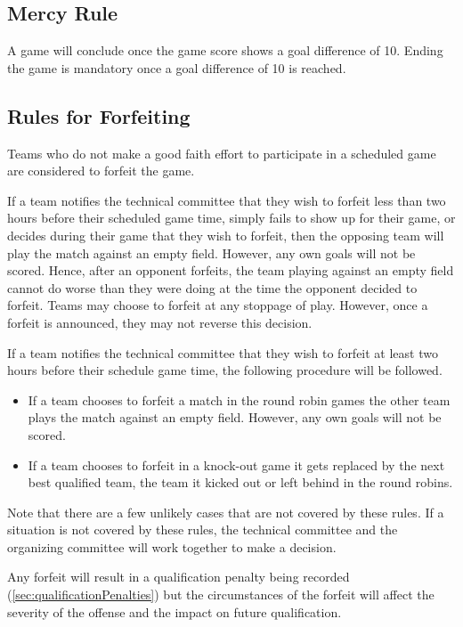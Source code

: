 \subsection{Mercy Rule}
\label{sec:mercy_rule}
A game will conclude once the game score shows a goal difference of 10.  Ending the game is mandatory once a goal difference of 10 is reached.

\subsection{Rules for Forfeiting}
\label{sec:forfeit}

Teams who do not make a good faith effort to participate in a scheduled game are considered to forfeit the game.

If a team notifies the technical committee that they wish to forfeit less than two hours before their scheduled game time, simply fails to show up for their game, or decides during their game that they wish to forfeit, then the opposing team will play the match against an empty field.  However, any own goals will not be scored.  Hence, after an opponent forfeits, the team playing against an empty field cannot do worse than they were doing at the time the opponent decided to forfeit.  Teams may choose to forfeit at any stoppage of play.  However, once a forfeit is announced, they may not reverse this decision.

If a team notifies the technical committee that they wish to forfeit at least two hours before their schedule game time, the following procedure will be followed.

\begin{itemize}
  \item If a team chooses to forfeit a match in the round robin games the other team plays the match against an empty field.  However, any own goals will not be scored.
  \item If a team chooses to forfeit in a knock-out game it gets replaced by the next best qualified team, \ie the team it kicked out or left behind in the round robins.
\end{itemize}

Note that there are a few unlikely cases that are not covered by these rules.  If a situation is not covered by these rules, the technical committee and the organizing committee will work together to make a decision.

Any forfeit will result in a qualification penalty being recorded (\cf \cref{sec:qualificationPenalties}) but the circumstances of the forfeit will affect the severity of the offense and the impact on future qualification.

